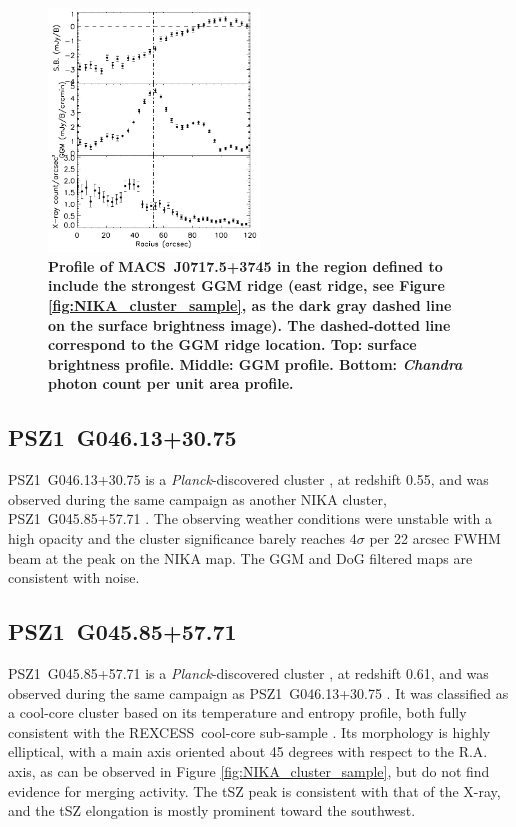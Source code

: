 \documentclass[twocolumn,traditabstract]{aa}
\newcommand{\rexcess}{{\gwpfont REXCESS}}
\begin{document}
\begin{figure}[h]
\center
\includegraphics[trim=0cm 0cm 0cm 0cm, clip=true, width=0.5\textwidth]{Figure/profile_MACSJ0717.pdf} 
\caption{\footnotesize{\bf Profile of \mbox{MACS~J0717.5+3745} in the region defined to include the strongest GGM ridge (east ridge, see Figure \ref{fig:NIKA_cluster_sample}, as the dark gray dashed line on the surface brightness image). The dashed-dotted line correspond to the GGM ridge location. {\bf Top:} surface brightness profile. {\bf Middle:} GGM profile. {\bf Bottom:} \textit{Chandra} photon count per unit area profile.}}
\label{fig:profile_MACSJ0717}
\end{figure}


\subsection{PSZ1~G046.13+30.75}
\mbox{PSZ1~G046.13+30.75} is a \textit{Planck}-discovered cluster \citep{PlanckXXIX2014}, at redshift 0.55, and was observed during the same campaign as another NIKA cluster, \mbox{PSZ1~G045.85+57.71} \citep[see][for more details]{Ruppin2016}. The observing weather conditions were unstable with a high opacity and the cluster significance barely reaches $4 \sigma$ per 22 arcsec FWHM beam at the peak on the NIKA map. The GGM and DoG filtered maps are consistent with noise.

\subsection{PSZ1~G045.85+57.71}
\mbox{PSZ1~G045.85+57.71} is a \textit{Planck}-discovered cluster \citep{PlanckXXIX2014}, at redshift 0.61, and was observed during the same campaign as \mbox{PSZ1~G046.13+30.75} \citep[see][for more details]{Ruppin2016}. It was classified as a cool-core cluster based on its temperature and entropy profile, both fully consistent with the \rexcess\ cool-core sub-sample \citep{Bohringer2007,Arnaud2010,Pratt2010}. Its morphology is highly elliptical, with a main axis oriented about 45 degrees with respect to the R.A. axis, as can be observed in Figure \ref{fig:NIKA_cluster_sample}, but \cite{Ruppin2016} do not find evidence for merging activity. The tSZ peak is consistent with that of the X-ray, and the tSZ elongation is mostly prominent toward the southwest.
\end{document}
